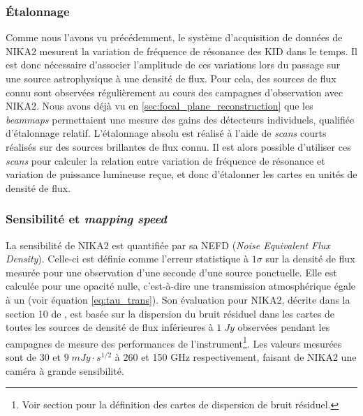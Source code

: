 \subsubsection{Étalonnage} %
Comme nous l'avons vu précédemment, le système d'acquisition de données de NIKA2 mesurent la variation de fréquence de résonance des KID dans le temps.
Il est donc nécessaire d'associer l'amplitude de ces variations lors du passage sur une source astrophysique à une densité de flux.
Pour cela, des sources de flux connu sont observées régulièrement au cours des campagnes d'observation avec NIKA2.
Nous avons déjà vu en \ref{sec:focal_plane_reconstruction} que les \textit{beammaps} permettaient une mesure des gains des détecteurs individuels, qualifiée d'étalonnage relatif.
L'étalonnage absolu est réalisé à l'aide de \textit{scans} courts réalisés sur des sources brillantes de flux connu.
Il est alors possible d'utiliser ces \textit{scans} pour calculer la relation entre variation de fréquence de résonance et variation de puissance lumineuse reçue, et donc d'étalonner les cartes en unités de densité de flux.

\subsubsection{Sensibilité et \textit{mapping speed}} %
La sensibilité de NIKA2 est quantifiée par sa NEFD (\textit{Noise Equivalent Flux Density}).
Celle-ci est définie comme l'erreur statistique à $1\sigma$ sur la densité de flux mesurée pour une observation d'une seconde d'une source ponctuelle.
Elle est calculée pour une opacité nulle, c'est-à-dire une transmission atmosphérique égale à un (voir équation \ref{eq:tau_trans}).
Son évaluation pour NIKA2, décrite dans la section 10 de \cite{perotto_calibration_2020}, est basée sur la dispersion du bruit résiduel dans les cartes de toutes les sources de densité de flux inférieures à $1 \;\unit{Jy}$ observées pendant les campagnes de mesure des performances de l'instrument\footnote{Voir section  pour la définition des cartes de dispersion de bruit résiduel.}.
Les valeurs mesurées sont de $30$ et $9 \;\unit{mJy \cdot s^{1/2}}$ à 260 et 150 GHz respectivement, faisant de NIKA2 une caméra à grande sensibilité.

